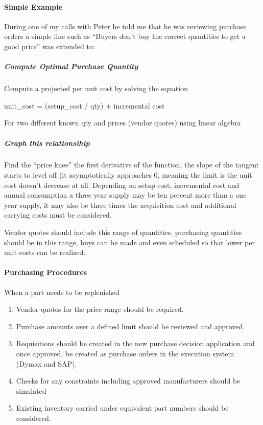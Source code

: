 \documentclass[letterpaper,10pt,english]{sphinxmanual}
\begin{document}
\paragraph{Simple Example}
\label{\detokenize{FutureState:simple-example}}
During one of my calls with Peter he told me that he was reviewing
purchase orders a simple line such as “Buyers don’t buy the correct
quantities to get a good price” was extended to:


\subparagraph{Compute Optimal Purchase Quantity}
\label{\detokenize{FutureState:compute-optimal-purchase-quantity}}
Compute a projected per unit cost by solving the equation

unit\_cost = (setup\_cost / qty) + incremental cost

For two different known qty and prices (vendor quotes) using linear
algebra


\subparagraph{Graph this relationsihip}
\label{\detokenize{FutureState:graph-this-relationsihip}}
Find the “price knee” the first derivative of the function, the slope of
the tangent starts to level off (it asymptotically approaches 0, meaning
the limit is the unit cost doesn’t decrease at all. Depending on setup
cost, incremental cost and annual consumption a three year supply may be
ten percent more than a one year supply, it may also be three times the
acquisition cost and additional carrying costs must be considered.

Vendor quotes should include this range of quantities, purchasing
quantities should be in this range, buys can be made and even scheduled
so that lower per unit costs can be realized.


\paragraph{Purchasing Procedures}
\label{\detokenize{FutureState:purchasing-procedures}}
When a part needs to be replenished
\begin{enumerate}
%
\item {} 
Vendor quotes for the price range should be required.

\item {} 
Purchase amounts over a defined limit should be reviewed and
approved.

\item {} 
Requisitions should be created in the new purchase decision
application and once approved, be created as purchase orders in the
execution system (Dymax and SAP).

\item {} 
Checks for any constraints including approved manufacturers should be
simulated

\item {} 
Existing inventory carried under equivalent part numbers should be
considered.

\end{enumerate}
\end{document}
